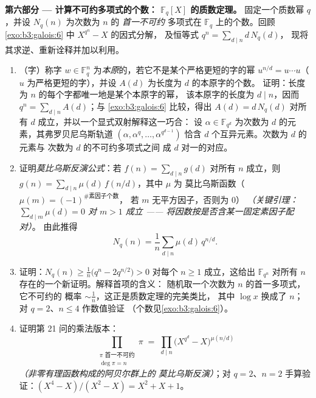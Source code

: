 \begin{problem}
\medskip
\noindent\textbf{第六部分 --- 计算不可约多项式的个数：
$\mathbb F_q[X]$ 的质数定理。} 固定一个质数幂
       $q$，并设 $N_q(n)$ 为次数为 $n$ 的 \emph{首一不可约}
       多项式在 $\mathbb F_q$ 上的个数。回顾
       \cref{exo:b3:galois:6} 中 $X^{q^n} - X$ 的因式分解，
       及恒等式 $q^n = \sum_{d\mid n}d\,N_q(d)$，
       现将其求逆、重新诠释并加以利用。
\begin{enumerate}[resume]
  \item （字）称字 $w \in \mathbb F_q^n$
        为\emph{本原}的，若它不是某个严格更短的字的幂 $u^{n/d} =
        u\cdots u$（$u$ 为严格更短的字），并设
        $A(d)$ 为长度为 $d$ 的本原字的个数。
        证明：长度为 $n$ 的每个字都唯一地是某个本原字的幂，
        该本原字的长度为 $d \mid n$，因而
        $q^n = \sum_{d \mid n}A(d)$；与
        \cref{exo:b3:galois:6} 比较，得出 $A(d) = d\,N_q(d)$
        对所有 $d$ 成立，并以一个显式双射解释这一巧合：
        设 $\alpha \in
        \mathbb F_{q^d}$ 为次数为 $d$ 的元素，其弗罗贝尼乌斯轨道
        $(\alpha, \alpha^q, \dots, \alpha^{q^{d-1}})$ 恰含
        $d$ 个互异元素。次数为 $d$ 的元素与
        次数为 $d$ 的不可约多项式之间
        成 $d$ 对一的对应。
  \item 证明\emph{莫比乌斯反演公式}：若 $f(n) =
        \sum_{d\mid n}g(d)$ 对所有 $n$ 成立，则 $g(n) =
        \sum_{d\mid n}\mu(d)\,f(n/d)$，其中 $\mu$ 为
        莫比乌斯函数（$\mu(m) = (-1)^{\#\text{素因子个数}}$，
        若 $m$ 无平方因子，否则为 $0$）
        \emph{（关键引理：$\sum_{d \mid m}\mu(d) = 0$ 对 $m >
        1$ 成立 —— 将因数按是否含某一固定素因子配对）}。
        由此推得
        \[
        N_q(n) = \frac1n\sum_{d \mid n}\mu(d)\,q^{n/d} .
        \]
  \item 证明：$N_q(n) \geq \frac1n\bigl(q^n - 2q^{n/2}\bigr) > 0$
        对每个 $n \geq 1$ 成立，这给出 $\mathbb F_{q^n}$
        对所有 $n$ 存在的一个新证明。解释首项的含义：
        随机取一个次数为 $n$ 的首一多项式，它不可约的
        概率 $\sim \frac1n$，这正是质数定理的完美类比，
        其中 $\log x$ 换成了 $n$；
        对 $q = 2$、$n \leq 4$ 作数值验证
        （个数见\cref{exo:b3:galois:6}）。
  \item 证明第 21 问的乘法版本：
        \[
        \prod_{\substack{\pi \text{ 首一不可约}\\ \deg\pi =
        n}}\pi \;=\; \prod_{d \mid n}
        \bigl(X^{q^d} - X\bigr)^{\mu(n/d)}
        \]
        \emph{（非零有理函数构成的阿贝尔群上的
        莫比乌斯反演）}；对 $q
        = 2$、$n = 2$ 手算验证：$(X^4 - X)/(X^2 - X) = X^2 + X + 1$。
\end{enumerate}


\end{problem}
